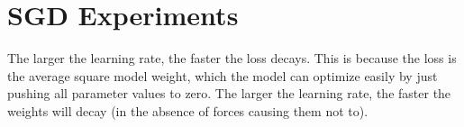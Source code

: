 \documentclass[11pt]{article}
\begin{document}
\section*{SGD Experiments}
The larger the learning rate, the faster the loss decays. This is because the loss is the average square model weight, which the model can optimize easily by just pushing all parameter values to zero. The larger the learning rate, the faster the weights will decay (in the absence of forces causing them not to).
\end{document}
